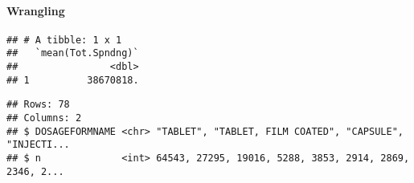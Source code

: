 \documentclass[
]{article}
\newenvironment{Shaded}{\begin{snugshade}}{\end{snugshade}}
\newcommand{\CommentTok}[1]{\textcolor[rgb]{0.56,0.35,0.01}{\textit{#1}}}
\newcommand{\DataTypeTok}[1]{\textcolor[rgb]{0.13,0.29,0.53}{#1}}
\newcommand{\DecValTok}[1]{\textcolor[rgb]{0.00,0.00,0.81}{#1}}
\newcommand{\KeywordTok}[1]{\textcolor[rgb]{0.13,0.29,0.53}{\textbf{#1}}}
\newcommand{\NormalTok}[1]{#1}
\newcommand{\OperatorTok}[1]{\textcolor[rgb]{0.81,0.36,0.00}{\textbf{#1}}}
\newcommand{\StringTok}[1]{\textcolor[rgb]{0.31,0.60,0.02}{#1}}
\begin{document}
\hypertarget{wrangling}{%
\paragraph{Wrangling}\label{wrangling}}

\begin{Shaded}
\end{Shaded}

\begin{verbatim}
## # A tibble: 1 x 1
##   `mean(Tot.Spndng)`
##                <dbl>
## 1          38670818.
\end{verbatim}

\begin{Shaded}
\end{Shaded}

\begin{verbatim}
## Rows: 78
## Columns: 2
## $ DOSAGEFORMNAME <chr> "TABLET", "TABLET, FILM COATED", "CAPSULE", "INJECTI...
## $ n              <int> 64543, 27295, 19016, 5288, 3853, 2914, 2869, 2346, 2...
\end{verbatim}

\begin{Shaded}
\end{Shaded}
\end{document}
